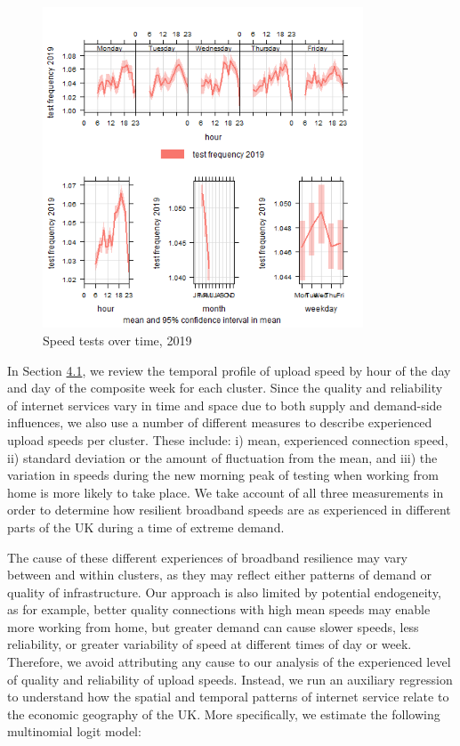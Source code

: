 \documentclass[Royal,times,sageh]{sagej}
\begin{document}
\begin{figure}
\centering
\includegraphics[width=0.85\textwidth,height=0.5\textheight]{figures/time.var.plot2019.png}
\caption{Speed tests over time, 2019 \label{test2019}}
\end{figure}

In Section \protect\hyperlink{sec:4.1}{4.1}, we review the temporal
profile of upload speed by hour of the day and day of the composite week
for each cluster. Since the quality and reliability of internet services
vary in time and space due to both supply and demand-side influences, we
also use a number of different measures to describe experienced upload
speeds per cluster. These include: i) mean, experienced connection
speed, ii) standard deviation or the amount of fluctuation from the
mean, and iii) the variation in speeds during the new morning peak of
testing when working from home is more likely to take place. We take
account of all three measurements in order to determine how resilient
broadband speeds are as experienced in different parts of the UK during
a time of extreme demand.

The cause of these different experiences of broadband resilience may
vary between and within clusters, as they may reflect either patterns of
demand or quality of infrastructure. Our approach is also limited by
potential endogeneity, as for example, better quality connections with
high mean speeds may enable more working from home, but greater demand
can cause slower speeds, less reliability, or greater variability of
speed at different times of day or week. Therefore, we avoid attributing
any cause to our analysis of the experienced level of quality and
reliability of upload speeds. Instead, we run an auxiliary regression to
understand how the spatial and temporal patterns of internet service
relate to the economic geography of the UK. More specifically, we
estimate the following multinomial logit model:
\end{document}
